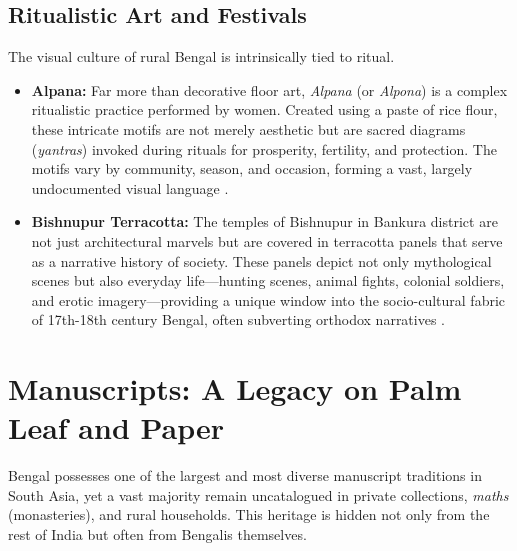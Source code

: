 \documentclass{article}
\begin{document}
\subsection{Ritualistic Art and Festivals}
The visual culture of rural Bengal is intrinsically tied to ritual.
\begin{itemize}
    \item \textbf{Alpana:} Far more than decorative floor art, \textit{Alpana} (or \textit{Alpona}) is a complex ritualistic practice performed by women. Created using a paste of rice flour, these intricate motifs are not merely aesthetic but are sacred diagrams (\textit{yantras}) invoked during rituals for prosperity, fertility, and protection. The motifs vary by community, season, and occasion, forming a vast, largely undocumented visual language \cite{huq2012}.
    \item \textbf{Bishnupur Terracotta:} The temples of Bishnupur in Bankura district are not just architectural marvels but are covered in terracotta panels that serve as a narrative history of society. These panels depict not only mythological scenes but also everyday life—hunting scenes, animal fights, colonial soldiers, and erotic imagery—providing a unique window into the socio-cultural fabric of 17th-18th century Bengal, often subverting orthodox narratives \cite{das2011}.
\end{itemize}

\section{Manuscripts: A Legacy on Palm Leaf and Paper}
Bengal possesses one of the largest and most diverse manuscript traditions in South Asia, yet a vast majority remain uncatalogued in private collections, \textit{maths} (monasteries), and rural households. This heritage is hidden not only from the rest of India but often from Bengalis themselves.
\end{document}
